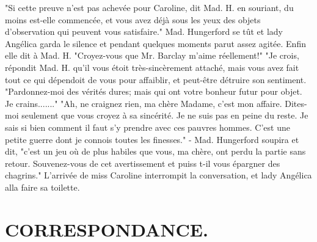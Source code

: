 "Si cette preuve n'est pas achevée pour Caroline, dit Mad. H. en souriant, du moins est-elle commencée, et vous avez déjà sous les yeux des objets d'observation qui peuvent vous satisfaire."
Mad. Hungerford se tût et lady Angélica garda le silence et pendant quelques moments parut assez agitée. Enfin elle dit à Mad. H. "Croyez-vous que Mr. Barclay m'aime réellement!"
"Je crois, répondit Mad. H. qu'il vous étoit très-sincèrement attaché, mais vous avez fait tout ce qui dépendoit de vous pour\setcounter{page}{540} affaiblir, et peut-être détruire son sentiment.
"Pardonnez-moi des vérités dures; mais qui ont votre bonheur futur pour objet. Je crains......."
"Ah, ne craignez rien, ma chère Madame, c'est mon affaire. Dites-moi seulement que vous croyez à sa sincérité. Je ne suis pas en peine du reste. Je sais si bien comment il faut s'y prendre avec ces pauvres hommes. C'est une petite guerre dont je connois toutes les finesses."
- Mad. Hungerford soupira et dit, "c'est un jeu où de plus habiles que vous, ma chère, ont perdu la partie sans retour. Souvenez-vous de cet avertissement et puiss t-il vous épargner des chagrins."
L'arrivée de miss Caroline interrompit la conversation, et lady Angélica alla faire sa toilette.
\section{CORRESPONDANCE.}